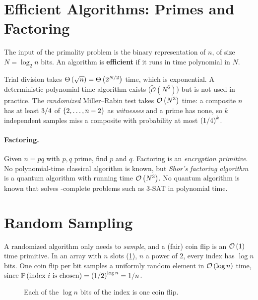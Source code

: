 
\section{Efficient Algorithms: Primes and Factoring}

The input of the primality problem is the binary representation of $n$, of size $N = \log_2 n$
bits. An algorithm is \textbf{efficient} if it runs in time polynomial in $N$.

Trial division takes $\Theta\left(\sqrt{n}\right) = \Theta\left(2^{N/2}\right)$ time, which is exponential. A deterministic
polynomial-time algorithm exists ($\tilde{\mathcal{O}}(N^{6})$) but is not used in practice. The
\emph{randomized} Miller--Rabin test takes $\mathcal{O}\left(N^3\right)$ time: a composite $n$ has at least
$3/4$ of $\left\lbrace2, \dots, n-2\right\rbrace$ as \emph{witnesses} and a prime has none, so $k$ independent
samples miss a composite with probability at most $\left(1/4\right)^k$.

\paragraph{Factoring.} Given $n = pq$ with $p, q$ prime, find $p$ and $q$. Factoring is an
\emph{encryption primitive}. No polynomial-time classical algorithm is known, but \emph{Shor's
factoring algorithm} is a quantum algorithm with running time $\mathcal{O}\left(N^3\right)$. No quantum algorithm is
known that solves \nptime-complete problems such as 3-SAT in polynomial time.

\section{Random Sampling}

A randomized algorithm only needs to \emph{sample}, and a (fair) coin flip is an $\mathcal{O}\left(1\right)$ time
primitive. In an array with $n$ slots (\cref{fig:coinflips-0825}), $n$ a power of $2$, every index
has $\log n$ bits. One coin flip per bit samples a uniformly random element in $\mathcal{O}\left(\log n\right)$ time,
since $\operatorname{\mathbb{P}}\left(\text{index $i$ is chosen}\right) = \left(1/2\right)^{\log n} = 1/n$.

\begin{figure}[ht]
    \centering
    \caption{Each of the $\log n$ bits of the index is one coin flip.}
    \label{fig:coinflips-0825}
\end{figure}

